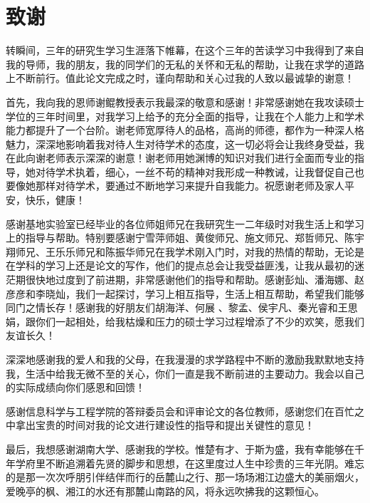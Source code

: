 \chapter*{致\quad 谢}
转瞬间，三年的研究生学习生涯落下帷幕，在这个三年的苦读学习中我得到了来自我的导师，我的朋友，我的同学们的无私的关怀和无私的帮助，让我在求学的道路上不断前行。值此论文完成之时，谨向帮助和关心过我的人致以最诚挚的谢意！

首先，我向我的恩师谢鲲教授表示我最深的敬意和感谢！非常感谢她在我攻读硕士学位的三年时间里，对我学习上给予的充分全面的指导，让我在个人能力上和学术能力都提升了一个台阶。谢老师宽厚待人的品格，高尚的师德，都作为一种深人格魅力，深深地影响着我对待人生对待学术的态度，这一切必将会让我终身受益，我在此向谢老师表示深深的谢意！谢老师用她渊博的知识对我们进行全面而专业的指导，她对待学术执着，细心，一丝不苟的精神对我形成一种教诫，让我督促自己也要像她那样对待学术，要通过不断地学习来提升自我能力。祝愿谢老师及家人平安，快乐，健康！

感谢基地实验室已经毕业的各位师姐师兄在我研究生一二年级时对我生活上和学习上的指导与帮助。特别要感谢宁雪萍师姐、黄俊师兄、施文师兄、郑哲师兄、陈宇翔师兄、王乐乐师兄和陈振华师兄在我学术刚入门时，对我的热情的帮助，无论是在学科的学习上还是论文的写作，他们的提点总会让我受益匪浅，让我从最初的迷茫期很快地过度到了前进期，非常感谢他们的指导和帮助。感谢彭灿、潘海娜、赵彦彦和李晓灿，我们一起探讨，学习上相互指导，生活上相互帮助，希望我们能够同门之情长存！感谢我的好朋友们胡海洋、何展 、黎孟、侯宇凡、秦光睿和王思娟，跟你们一起相处，给我枯燥和压力的硕士学习过程增添了不少的欢笑，愿我们友谊长久！

深深地感谢我的爱人和我的父母，在我漫漫的求学路程中不断的激励我默默地支持我，生活中给我无微不至的关心，你们一直是我不断前进的主要动力。我会以自己的实际成绩向你们感恩和回馈！

感谢信息科学与工程学院的答辩委员会和评审论文的各位教师，感谢您们在百忙之中拿出宝贵的时间对我的论文进行建设性的指导和提出关键性的意见！

最后，我想感谢湖南大学、感谢我的学校。惟楚有才、于斯为盛，我有幸能够在千年学府里不断追溯着先贤的脚步和思想，在这里度过人生中珍贵的三年光阴。难忘的是那一次次呼朋引伴结伴而行的岳麓山之行、那一场场湘江边盛大的美丽烟火，爱晚亭的枫、湘江的水还有那麓山南路的风，将永远吹拂我的这颗恒心。







